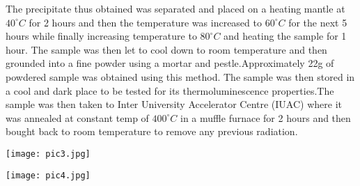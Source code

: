\documentclass[../experiment.tex]{subfiles}
\begin{document}
        The precipitate thus obtained was separated and placed on a heating mantle at $40^{\circ}C$ for 2 hours and then
        the temperature was increased to $60^{\circ}C$ for the next 5 hours while finally increasing temperature to $80^{\circ}C$ and
        heating the sample for 1 hour. The sample was then let to cool down to room temperature and then grounded
        into a fine powder using a mortar and pestle.Approximately 22g of powdered sample was obtained using this
        method. The sample was then stored in a cool and dark place to be tested for its thermoluminescence
        properties.The sample was then taken to Inter University Accelerator Centre (IUAC) where it was annealed at
        constant temp of $400^{\circ}C$ in a muffle furnace for 2 hours and then bought back to room temperature to remove
        any previous radiation.
        \FloatBarrier\begin{multicols}{2}
            \begin{Figure}
                \centering
                \texttt{[image: pic3.jpg]}
                \label{fig:pic3}
            \end{Figure}
            \begin{Figure}
                \centering
                \texttt{[image: pic4.jpg]}
                \label{fig:pic4}
            \end{Figure}
        \end{multicols}
\end{document}
